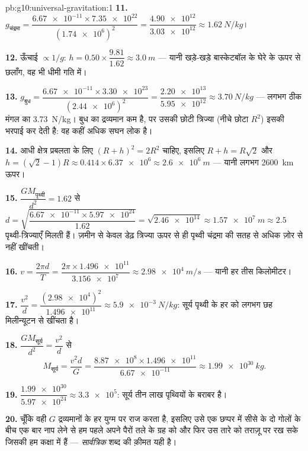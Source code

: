 \begin{solution}{pb:g10:universal-gravitation:1}
\textbf{11.} $g_{\text{चंद्रमा}} = \dfrac{\num{6.67e-11} \times
\num{7.35e22}}{(\num{1.74e6})^2} = \dfrac{\num{4.90e12}}
{\num{3.03e12}} \approx \qty{1.62}{N/kg}$।

\textbf{12.} ऊँचाई $\propto 1/g$: $h = 0.50 \times \dfrac{9.81}{1.62} \approx \qty{3.0}{m}$ --- यानी खड़े-खड़े बास्केटबॉल के
घेरे के ऊपर से छलाँग, वह भी धीमी गति में।

\textbf{13.} $g_{\text{बुध}} = \dfrac{\num{6.67e-11} \times
\num{3.30e23}}{(\num{2.44e6})^2} = \dfrac{\num{2.20e13}}
{\num{5.95e12}} \approx \qty{3.70}{N/kg}$ --- लगभग ठीक मंगल का \qty{3.73}{N/kg}। बुध का द्रव्यमान कम
है, पर उसकी छोटी त्रिज्या (नीचे छोटा $R^2$) इसकी भरपाई कर देती है: वह
कहीं अधिक सघन लोक है।

\textbf{14.} आधी क्षेत्र प्रबलता के लिए $(R + h)^2 = 2 R^2$ चाहिए, इसलिए $R + h = R\sqrt{2}$ और
$h = (\sqrt{2} - 1) R \approx 0.414 \times \num{6.37e6}
\approx \qty{2.6e6}{m}$ --- यानी लगभग \qty{2600}{km} ऊपर।

\textbf{15.} $\dfrac{G M_{\text{पृथ्वी}}}{d^2} = 1.62$ से $d = \sqrt{\dfrac{\num{6.67e-11} \times \num{5.97e24}}{1.62}}
= \sqrt{\num{2.46e14}} \approx \qty{1.57e7}{m} \approx 2.5$ पृथ्वी-त्रिज्याएँ मिलती हैं। ज़मीन से
केवल डेढ़ त्रिज्या ऊपर से ही पृथ्वी चंद्रमा की सतह से अधिक ज़ोर से नहीं
खींचती।

\textbf{16.} $v = \dfrac{2\pi d}{T}
= \dfrac{2\pi \times \num{1.496e11}}{\num{3.156e7}}
\approx \qty{2.98e4}{m/s}$ --- यानी हर  तीस किलोमीटर।

\textbf{17.} $\dfrac{v^2}{d} = \dfrac{(\num{2.98e4})^2}{\num{1.496e11}}
\approx \qty{5.9e-3}{N/kg}$: सूर्य पृथ्वी के हर  को लगभग छह
मिलीन्यूटन से खींचता है।

\textbf{18.} $\dfrac{G M_{\text{सूर्य}}}{d^2} = \dfrac{v^2}{d}$ से
\[
M_{\text{सूर्य}} = \frac{v^2 d}{G}
= \frac{\num{8.87e8} \times \num{1.496e11}}{\num{6.67e-11}}
\approx \qty{1.99e30}{kg}.
\]

\textbf{19.} $\dfrac{\num{1.99e30}}{\num{5.97e24}} \approx
\num{3.3e5}$: सूर्य तीन लाख पृथ्वियों के बराबर है।

\textbf{20.} चूँकि वही $G$ द्रव्यमानों के हर युग्म पर राज करता है,
इसलिए उसे एक छप्पर में सीसे के दो गोलों के बीच एक बार नाप लेने से हम
पहले अपने पैरों तले के ग्रह को और फिर उस तारे को तराज़ू पर रख सके
जिसकी हम कक्षा में हैं --- \emph{सार्वत्रिक} शब्द की क़ीमत
यही है।
\end{solution}

